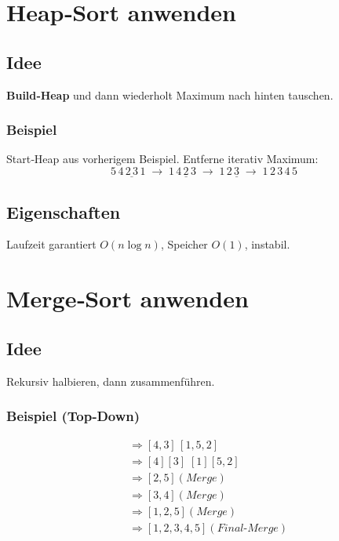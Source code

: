 \section{Heap‑Sort anwenden}
\subsection*{Idee}
\textbf{Build‑Heap} und dann wiederholt Maximum nach hinten tauschen.

\subsubsection*{Beispiel}
Start‑Heap aus vorherigem Beispiel. Entferne iterativ Maximum:
\[
5\,\underline{4\,2\,3\,1}\;\rightarrow\;1\,\underline{4\,2\,3}\;\rightarrow\;1\,2\,\underline{3}\;\rightarrow\;1\,2\,3\,4\,5
\]

\subsection*{Eigenschaften}
Laufzeit garantiert $O(n\log n)$, Speicher $O(1)$, instabil.

\section{Merge‑Sort anwenden}
\subsection*{Idee}
Rekursiv halbieren, dann zusammenführen.

\subsubsection*{Beispiel (Top‑Down)}
\begin{align*}
[4,3,1,5,2] &\Rightarrow [4,3] \,[1,5,2]\\
&\Rightarrow [4] [3] \;[1] [5,2]\\
&\Rightarrow [2,5] (Merge)\\
&\Rightarrow [3,4] (Merge)\\
&\Rightarrow [1,2,5] (Merge)\\
&\Rightarrow [1,2,3,4,5] (Final‑Merge)
\end{align*}

